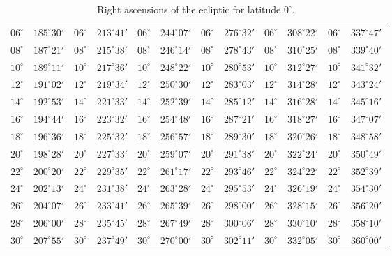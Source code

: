 \begin{table}[!h]
{\begin{tabular}{cc|cc|cc|cc|cc|cc}
$06^\circ$ & $185^\circ30'$ & $06^\circ$ & $213^\circ41'$ & $06^\circ$ & $244^\circ07'$ & $06^\circ$ & $276^\circ32'$ &  $06^\circ$ & $308^\circ22'$ & $06^\circ$ & $337^\circ47'$\\
$08^\circ$ & $187^\circ21'$ & $08^\circ$ & $215^\circ38'$ & $08^\circ$ & $246^\circ14'$ & $08^\circ$ & $278^\circ43'$ &  $08^\circ$ & $310^\circ25'$ & $08^\circ$ & $339^\circ40'$\\
$10^\circ$ & $189^\circ11'$ & $10^\circ$ & $217^\circ36'$ & $10^\circ$ & $248^\circ22'$ & $10^\circ$ & $280^\circ53'$ &  $10^\circ$ & $312^\circ27'$ & $10^\circ$ & $341^\circ32'$\\
$12^\circ$ & $191^\circ02'$ & $12^\circ$ & $219^\circ34'$ & $12^\circ$ & $250^\circ30'$ & $12^\circ$ & $283^\circ03'$ &  $12^\circ$ & $314^\circ28'$ & $12^\circ$ & $343^\circ24'$\\
$14^\circ$ & $192^\circ53'$ & $14^\circ$ & $221^\circ33'$ & $14^\circ$ & $252^\circ39'$ & $14^\circ$ & $285^\circ12'$ &  $14^\circ$ & $316^\circ28'$ & $14^\circ$ & $345^\circ16'$\\
$16^\circ$ & $194^\circ44'$ & $16^\circ$ & $223^\circ32'$ & $16^\circ$ & $254^\circ48'$ & $16^\circ$ & $287^\circ21'$ &  $16^\circ$ & $318^\circ27'$ & $16^\circ$ & $347^\circ07'$\\
$18^\circ$ & $196^\circ36'$ & $18^\circ$ & $225^\circ32'$ & $18^\circ$ & $256^\circ57'$ & $18^\circ$ & $289^\circ30'$ &  $18^\circ$ & $320^\circ26'$ & $18^\circ$ & $348^\circ58'$\\
$20^\circ$ & $198^\circ28'$ & $20^\circ$ & $227^\circ33'$ & $20^\circ$ & $259^\circ07'$ & $20^\circ$ & $291^\circ38'$ &  $20^\circ$ & $322^\circ24'$ & $20^\circ$ & $350^\circ49'$\\
$22^\circ$ & $200^\circ20'$ & $22^\circ$ & $229^\circ35'$ & $22^\circ$ & $261^\circ17'$ & $22^\circ$ & $293^\circ46'$ &  $22^\circ$ & $324^\circ22'$ & $22^\circ$ & $352^\circ39'$\\
$24^\circ$ & $202^\circ13'$ & $24^\circ$ & $231^\circ38'$ & $24^\circ$ & $263^\circ28'$ & $24^\circ$ & $295^\circ53'$ &  $24^\circ$ & $326^\circ19'$ & $24^\circ$ & $354^\circ30'$\\
$26^\circ$ & $204^\circ07'$ & $26^\circ$ & $233^\circ41'$ & $26^\circ$ & $265^\circ39'$ & $26^\circ$ & $298^\circ00'$ &  $26^\circ$ & $328^\circ15'$ & $26^\circ$ & $356^\circ20'$\\
$28^\circ$ & $206^\circ00'$ & $28^\circ$ & $235^\circ45'$ & $28^\circ$ & $267^\circ49'$ & $28^\circ$ & $300^\circ06'$ &  $28^\circ$ & $330^\circ10'$ & $28^\circ$ & $358^\circ10'$\\
$30^\circ$ & $207^\circ55'$ & $30^\circ$ & $237^\circ49'$ & $30^\circ$ & $270^\circ00'$ & $30^\circ$ & $302^\circ11'$ &  $30^\circ$ & $332^\circ05'$ & $30^\circ$ & $360^\circ00'$\\
\end{tabular}}
\caption{Right ascensions of the ecliptic for latitude $0^\circ$.}\label{tx}
\end{table}

